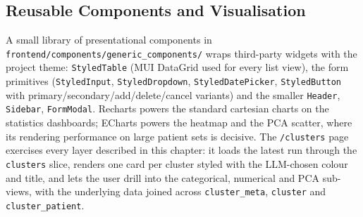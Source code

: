\subsection{Reusable Components and Visualisation}

A small library of presentational components in \texttt{frontend/components/generic\_components/} wraps third-party widgets with the project theme: \texttt{StyledTable} (MUI DataGrid used for every list view), the form primitives (\texttt{StyledInput}, \texttt{StyledDropdown}, \texttt{StyledDatePicker}, \texttt{StyledButton} with primary/secondary/add/delete/cancel variants) and the smaller \texttt{Header}, \texttt{Sidebar}, \texttt{FormModal}. Recharts powers the standard cartesian charts on the statistics dashboards; ECharts powers the heatmap and the PCA scatter, where its rendering performance on large patient sets is decisive. The \texttt{/clusters} page exercises every layer described in this chapter: it loads the latest run through the \texttt{clusters} slice, renders one card per cluster styled with the LLM-chosen colour and title, and lets the user drill into the categorical, numerical and PCA sub-views, with the underlying data joined across \texttt{cluster\_meta}, \texttt{cluster} and \texttt{cluster\_patient}.
